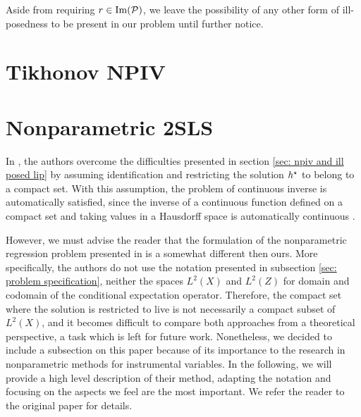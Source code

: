 Aside from requiring $ r \in \operatorname{Im} ( \mathcal{P} ) $, we leave the possibility of any other form of ill-posedness to be present in our problem until further notice.

\section{Tikhonov NPIV}

\section{Nonparametric 2SLS}

In \cite{newey2003}, the authors overcome the difficulties presented in section \ref{sec: npiv and ill posed lip} by assuming identification and restricting the solution $ h^{ \star } $ to belong to a compact set.
With this assumption, the problem of continuous inverse is automatically satisfied, since the inverse of a continuous function defined on a compact set and taking values in a Hausdorff space is automatically continuous \cite{munkres2000}.

However, we must advise the reader that the formulation of the nonparametric regression problem presented in \cite{newey2003} is a somewhat different then ours.
More specifically, the authors do not use the notation presented in subsection \ref{sec: problem specification}, neither the spaces $ L^2 ( X ) $ and $ L^2 ( Z ) $ for domain and codomain of the conditional expectation operator.
Therefore, the compact set where the solution is restricted to live is not necessarily a compact subset of $ L^{ 2 } ( X ) $, and it becomes difficult to compare both approaches from a theoretical perspective, a task which is left for future work.
Nonetheless, we decided to include a subsection on this paper because of its importance to the research in nonparametric methods for instrumental variables.
In the following, we will provide a high level description of their method, adapting the notation and focusing on the aspects we feel are the most important.
We refer the reader to the original paper for details.

